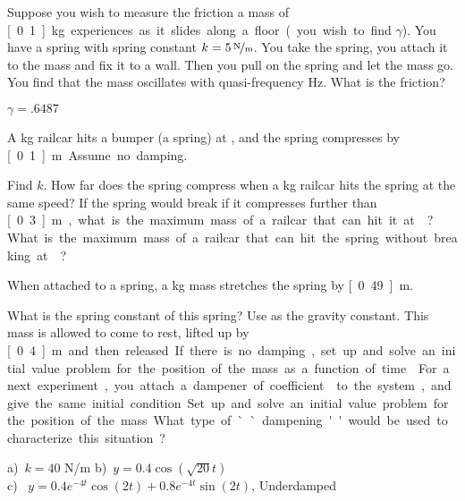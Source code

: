 \begin{exercise}
Suppose you wish to measure the friction a mass of \unit[0.1]{kg} experiences
as it slides along a floor (you wish to find $\gamma$).  You have a spring with
spring constant $k=\unitfrac[5]{N}{m}$.  You take the spring, you attach it
to the mass and fix it to a wall.  Then you pull on the spring and let the
mass go.  You find that the mass oscillates with quasi-frequency \unit[1]{Hz}.
What is the friction?
\end{exercise}
\comboSol{%
}
{%
$\gamma = .6487$
}

\begin{exercise}\ansMark%
\pagebreak[2]
A \unit[5000]{kg} railcar hits a bumper (a spring) at ,
and the spring compresses by \unit[0.1]{m}.  Assume no damping.
\begin{tasks}
\task Find $k$.
\task How far does the spring compress when a
\unit[10000]{kg} railcar hits the spring at the same speed?
\task If the spring
would break if it compresses further than \unit[0.3]{m}, what is the maximum
mass of a railcar that can hit it at ?
\task What is
the maximum mass of a railcar that can hit the spring without breaking
at ?
\end{tasks}
\end{exercise}

\begin{exercise}
When attached to a spring, a \unit[2]{kg} mass stretches the spring by \unit[0.49]{m}. 
\begin{tasks}
\task What is the spring constant of this spring? Use  as the gravity constant.  
\task This mass is allowed to come to rest, lifted up by \unit[0.4]{m} and then released. If there is no damping, set up and solve an initial value problem for the position of the mass as a function of time.
\task For a next experiment, you attach a dampener of coefficient  to the system, and give the same initial condition. Set up and solve an initial value problem for the position of the mass. What type of ``dampening'' would be used to characterize this situation?
\end{tasks}
\end{exercise}
\comboSol{%
}
{%
a)~$k=40$ N/m \quad b)~$y = 0.4 \cos(\sqrt{20}t)$ \\
c)~ $y = 0.4 e^{-4t}\cos(2t) + 0.8e^{-4t}\sin(2t)$, Underdamped
}

